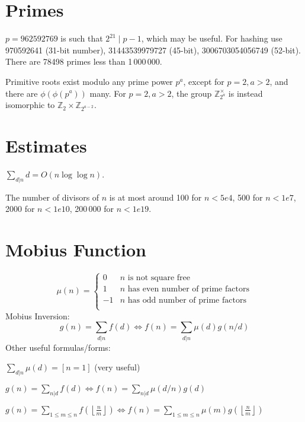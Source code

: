 \section{Primes}
  $p=962592769$ is such that $2^{21} \mid p-1$, which may be useful. For hashing
  use 970592641 (31-bit number), 31443539979727 (45-bit), 3006703054056749
  (52-bit). There are 78498 primes less than 1\,000\,000.

  Primitive roots exist modulo any prime power $p^a$, except for $p = 2, a > 2$, and there are $\phi(\phi(p^a))$ many.
  For $p = 2, a > 2$, the group $\mathbb Z_{2^a}^\times$ is instead isomorphic to $\mathbb Z_2 \times \mathbb Z_{2^{a-2}}$.

\section{Estimates}
  $\sum_{d|n} d = O(n \log \log n)$.

  The number of divisors of $n$ is at most around 100 for $n < 5e4$, 500 for $n < 1e7$, 2000 for $n < 1e10$, 200\,000 for $n < 1e19$.

\section{Mobius Function}
\[
  \mu(n) = \begin{cases} 0 & n \textrm{ is not square free}\\ 1 & n \textrm{ has even number of prime factors}\\ -1 & n \textrm{ has odd number of prime factors}\\\end{cases}
\]
  Mobius Inversion:
  \[ g(n) = \sum_{d|n} f(d) \Leftrightarrow f(n) = \sum_{d|n} \mu(d)g(n/d) \]
  Other useful formulas/forms:

  $ \sum_{d | n} \mu(d) = [ n = 1] $ (very useful)

  $ g(n) = \sum_{n|d} f(d) \Leftrightarrow f(n) = \sum_{n|d} \mu(d/n)g(d)$

  $ g(n) = \sum_{1 \leq m \leq n} f(\left\lfloor\frac{n}{m}\right \rfloor ) \Leftrightarrow f(n) = \sum_{1\leq m\leq n} \mu(m)g(\left\lfloor\frac{n}{m}\right\rfloor)$
